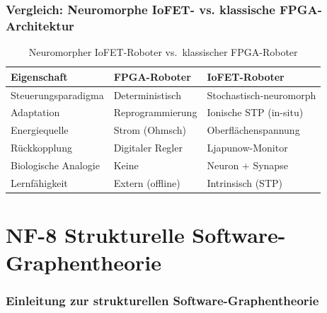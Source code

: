 ﻿\documentclass[a4paper,12pt]{scrreprt}
\theoremstyle{definition}
\begin{document}
\section{Vergleich: Neuromorphe IoFET- vs. klassische FPGA-Architektur}

\begin{table}[H]
\caption{Neuromorpher IoFET-Roboter vs.\ klassischer FPGA-Roboter}
\label{tab:nf7_vergleich}
\begin{tabular}{lll}
\toprule
\textbf{Eigenschaft}         & \textbf{FPGA-Roboter}     & \textbf{IoFET-Roboter} \\
\midrule
Steuerungsparadigma          & Deterministisch           & Stochastisch-neuromorph \\
Adaptation                   & Reprogrammierung          & Ionische STP (in-situ) \\
Energiequelle                & Strom (Ohmsch)            & Oberflächenspannung \\
Rückkopplung                 & Digitaler Regler          & Ljapunow-Monitor \\
Biologische Analogie         & Keine                     & Neuron + Synapse \\
Lernfähigkeit                & Extern (offline)          & Intrinsisch (STP) \\
\bottomrule
\end{tabular}
\end{table}

\part{NF-8 \quad Strukturelle Software-Graphentheorie}
\label{part:nf8}

\section{Einleitung zur strukturellen Software-Graphentheorie}
\end{document}
